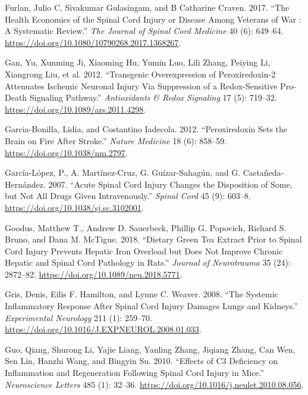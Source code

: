 \documentclass[9pt,lineno]{elife}
\newlength{\cslhangindent}
\newlength{\cslentryspacingunit} %
\newenvironment{CSLReferences}[2] %
 {%
  \setlength{\parindent}{0pt}
  \ifodd #1
  \let\oldpar\par
  \def\par{\hangindent=\cslhangindent\oldpar}
  \fi
  \setlength{\parskip}{#2\cslentryspacingunit}
 }%
 {}
\begin{document}
\begin{landscape}
\begin{landscape}
\begin{CSLReferences}{1}{0}
\leavevmode{}%
Furlan, Julio C, Sivakumar Gulasingam, and B Catharine Craven. 2017. {``The {Health Economics} of the Spinal Cord Injury or Disease Among Veterans of War : {A} Systematic Review.''} \emph{The Journal of Spinal Cord Medicine} 40 (6): 649--64. \url{https://doi.org/10.1080/10790268.2017.1368267}.

\leavevmode{}%
Gan, Yu, Xunming Ji, Xiaoming Hu, Yumin Luo, Lili Zhang, Peiying Li, Xiangrong Liu, et al. 2012. {``Transgenic {Overexpression} of {Peroxiredoxin-2 Attenuates Ischemic Neuronal Injury Via Suppression} of a {Redox-Sensitive Pro-Death Signaling Pathway}.''} \emph{Antioxidants \& Redox Signaling} 17 (5): 719--32. \url{https://doi.org/10.1089/ars.2011.4298}.

\leavevmode{}%
Garcia-Bonilla, Lidia, and Costantino Iadecola. 2012. {``Peroxiredoxin Sets the Brain on Fire After Stroke.''} \emph{Nature Medicine} 18 (6): 858--59. \url{https://doi.org/10.1038/nm.2797}.

\leavevmode{}%
García-López, P., A. Martínez-Cruz, G. Guízar-Sahagún, and G. Castañeda-Hernández. 2007. {``Acute Spinal Cord Injury Changes the Disposition of Some, but Not All Drugs Given Intravenously.''} \emph{Spinal Cord} 45 (9): 603--8. \url{https://doi.org/10.1038/sj.sc.3102001}.

\leavevmode{}%
Goodus, Matthew T., Andrew D. Sauerbeck, Phillip G. Popovich, Richard S. Bruno, and Dana M. McTigue. 2018. {``Dietary Green Tea Extract Prior to Spinal Cord Injury Prevents Hepatic Iron Overload but Does Not Improve Chronic Hepatic and Spinal Cord Pathology in Rats.''} \emph{Journal of Neurotrauma} 35 (24): 2872--82. \url{https://doi.org/10.1089/neu.2018.5771}.

\leavevmode{}%
Gris, Denis, Eilis F. Hamilton, and Lynne C. Weaver. 2008. {``The Systemic Inflammatory Response After Spinal Cord Injury Damages Lungs and Kidneys.''} \emph{Experimental Neurology} 211 (1): 259--70. \url{https://doi.org/10.1016/J.EXPNEUROL.2008.01.033}.

\leavevmode{}%
Guo, Qiang, Shurong Li, Yajie Liang, Yanling Zhang, Jiqiang Zhang, Can Wen, Sen Lin, Hanzhi Wang, and Bingyin Su. 2010. {``Effects of {C3} Deficiency on Inflammation and Regeneration Following Spinal Cord Injury in Mice.''} \emph{Neuroscience Letters} 485 (1): 32--36. \url{https://doi.org/10.1016/j.neulet.2010.08.056}.


\end{CSLReferences}
\end{landscape}
\end{landscape}
\end{document}
